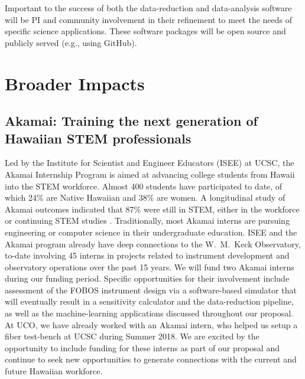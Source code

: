 \documentclass[oneside,11pt]{amsart}
\begin{document}
Important to the success of both the data-reduction and data-analysis
software will be PI and community involvement in their refinement to
meet the needs of specific science applications.  These software
packages will be open source and publicly served (e.g., using GitHub).


\section{Broader Impacts}
\label{sec:bi}


\subsection{Akamai: Training the next generation of Hawaiian STEM
professionals} Led by the Institute for Scientist and Engineer Educators
(ISEE) at UCSC, the Akamai Internship Program is aimed at advancing
college students from Hawaii into the STEM workforce.  Almost 400
students have participated to date, of which 24\% are Native Hawaiian
and 38\% are women. A longitudinal study of Akamai outcomes indicated
that 87\% were still in STEM, either in the workforce or continuing STEM
studies \citep{asee_peer_31030}.  Traditionally, most Akamai interns are
pursuing engineering or computer science in their undergraduate
education.  ISEE and the Akamai program already have deep connections to
the W.~M.~Keck Observatory, to-date involving 45 interns in projects
related to instrument development and observatory operations over the
past 15 years.  We will fund two Akamai interns during our funding
period.  Specific opportunities for their involvement include assessment
of the FOBOS instrument design via a software-based simulator that will
eventually result in a sensitivity calculator and the data-reduction
pipeline, as well as the machine-learning applications discussed
throughout our proposal.  At UCO, we have already worked with an Akamai
intern, who helped us setup a fiber test-bench at UCSC during Summer
2018. We are excited by the opportunity to include funding for these
interns as part of our proposal and continue to seek new opportunities
to generate connections with the current and future Hawaiian workforce.
\end{document}
